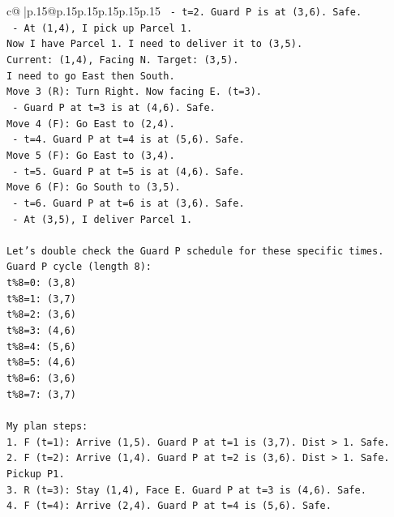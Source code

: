 \documentclass{article}
\begin{document}
{\begin{supertabular}{c@{$\;$}|p{.15\linewidth}@{}p{.15\linewidth}p{.15\linewidth}p{.15\linewidth}p{.15\linewidth}p{.15\linewidth}}
{{{\texttt{   {-} t=2. Guard P is at (3,6). Safe.} \\
\texttt{   {-} At (1,4), I pick up Parcel 1.} \\
\texttt{Now I have Parcel 1. I need to deliver it to (3,5).} \\
\texttt{Current: (1,4), Facing N. Target: (3,5).} \\
\texttt{I need to go East then South.} \\
\texttt{Move 3 (R): Turn Right. Now facing E. (t=3).} \\
\texttt{   {-} Guard P at t=3 is at (4,6). Safe.} \\
\texttt{Move 4 (F): Go East to (2,4).} \\
\texttt{   {-} t=4. Guard P at t=4 is at (5,6). Safe.} \\
\texttt{Move 5 (F): Go East to (3,4).} \\
\texttt{   {-} t=5. Guard P at t=5 is at (4,6). Safe.} \\
\texttt{Move 6 (F): Go South to (3,5).} \\
\texttt{   {-} t=6. Guard P at t=6 is at (3,6). Safe.} \\
\texttt{   {-} At (3,5), I deliver Parcel 1.} \\
\\ 
\texttt{Let's double check the Guard P schedule for these specific times.} \\
\texttt{Guard P cycle (length 8):} \\
\texttt{t\%8=0: (3,8)} \\
\texttt{t\%8=1: (3,7)} \\
\texttt{t\%8=2: (3,6)} \\
\texttt{t\%8=3: (4,6)} \\
\texttt{t\%8=4: (5,6)} \\
\texttt{t\%8=5: (4,6)} \\
\texttt{t\%8=6: (3,6)} \\
\texttt{t\%8=7: (3,7)} \\
\\ 
\texttt{My plan steps:} \\
\texttt{1. F (t=1): Arrive (1,5). Guard P at t=1 is (3,7). Dist > 1. Safe.} \\
\texttt{2. F (t=2): Arrive (1,4). Guard P at t=2 is (3,6). Dist > 1. Safe. Pickup P1.} \\
\texttt{3. R (t=3): Stay (1,4), Face E. Guard P at t=3 is (4,6). Safe.} \\
\texttt{4. F (t=4): Arrive (2,4). Guard P at t=4 is (5,6). Safe.} \\
}}}
\end{supertabular}}
\end{document}
